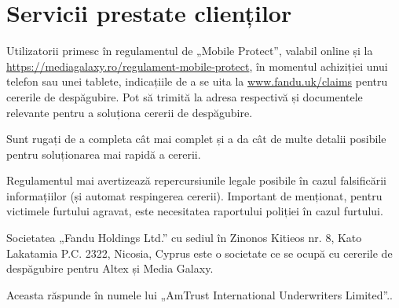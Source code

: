 \section*{Servicii prestate clienților}
	Utilizatorii primesc în regulamentul de „Mobile Protect”, valabil online și la \url{https://mediagalaxy.ro/regulament-mobile-protect}\cite{media_galaxy}, în momentul achiziției unui telefon sau unei tablete, indicațiile de a se uita la \url{www.fandu.uk/claims} pentru cererile de despăgubire.
	Pot să trimită la adresa respectivă și documentele relevante pentru a soluționa cererii de despăgubire.

	Sunt rugați de a completa cât mai complet și a da cât de multe detalii posibile pentru soluționarea mai rapidă a cererii.

	Regulamentul mai avertizează repercursiunile legale posibile în cazul falsificării informațiilor (și automat respingerea cererii).
	Important de menționat, pentru victimele furtului agravat, este necesitatea raportului poliției în cazul furtului.

	Societatea „Fandu Holdings Ltd.” cu sediul în Zinonos Kitieos nr. 8, Kato Lakatamia P.C. 2322, Nicosia, Cyprus\cite{fandu_uk} este o societate ce se ocupă cu cererile de despăgubire pentru Altex și Media Galaxy\cite{media_galaxy}.

	Aceasta răspunde în numele lui „AmTrust International Underwriters Limited”.\cite{media_galaxy}.
